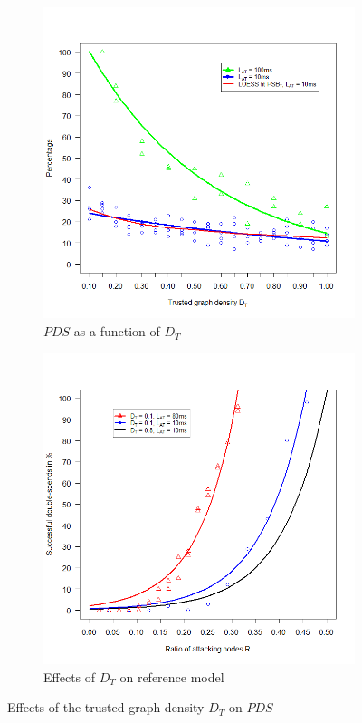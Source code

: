 \documentclass[a4paper,12pt,twoside]{report}
\begin{document}
\begin{figure}[hb!]
\centering
\begin{subfigure}{.5\textwidth}
  \centering
  \includegraphics[width=\linewidth]{Experiments/TruDensity/trudens.png}
  \caption{$PDS$ as a function of $D_{T}$}
  \label{trudens:a}
\end{subfigure}%
\begin{subfigure}{.5\textwidth}
  \centering
  \includegraphics[width=\linewidth]{Experiments/TruDensity/trudensrat.png}
  \caption{Effects of $D_{T}$ on reference model}
  \label{trudens:b}
\end{subfigure}
\caption{Effects of the trusted graph density $D_{T}$ on $PDS$}
\label{trudens}
\end{figure}
\end{document}
